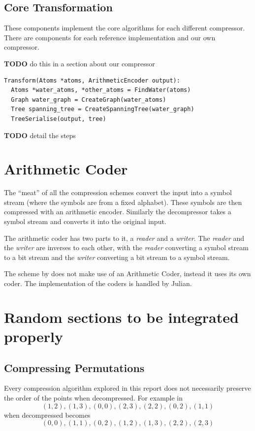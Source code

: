 \documentclass{report}
\begin{document}
\subsection{Core Transformation}

These components implement the core algorithms for each different
compressor. There are components for each reference implementation and our own
compressor.

\textbf{TODO} do this in a section about our compressor

\begin{verbatim}
Transform(Atoms *atoms, ArithmeticEncoder output):
  Atoms *water_atoms, *other_atoms = FindWater(atoms)
  Graph water_graph = CreateGraph(water_atoms)
  Tree spanning_tree = CreateSpanningTree(water_graph)
  TreeSerialise(output, tree)
\end{verbatim}

\textbf{TODO} detail the steps

\section{Arithmetic Coder}

The ``meat'' of all the compression schemes convert the input into a symbol
stream (where the symbols are from a fixed alphabet). These symbols are then
compressed with an arithmetic encoder. Similarly the decompressor takes a
symbol stream and converts it into the original input.

The arithmetic coder has two parts to it, a \emph{reader} and a
\emph{writer}. The \emph{reader} and the \emph{writer} are inverses to each
other, with the \emph{reader} converting a symbol stream to a bit stream and
the \emph{writer} converting a bit stream to a symbol stream.

The scheme by \citet{omeltchenko2000sls} does not make use of an Arithmetic
Coder, instead it uses its own coder. The implementation of the coders is
handled by Julian.


\section{Random sections to be integrated properly}

\subsection{Compressing Permutations}

Every compression algorithm explored in this report does not necessarily
preserve the order of the points when decompressed. For example in
\cite{devillers2000gci}
\[ (1, 2), (1, 3), (0, 0), (2, 3), (2, 2), (0, 2), (1, 1) \]
when decompressed becomes
\[ (0, 0), (1, 1), (0, 2), (1, 2), (1, 3), (2, 2), (2, 3) \]
\end{document}

